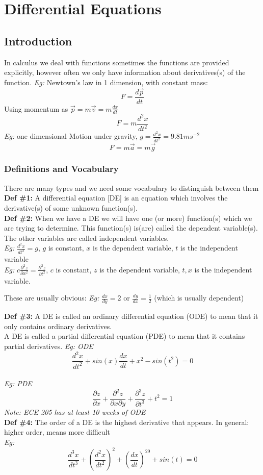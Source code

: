 \documentclass[11pt]{article}
\theoremstyle{definition}
\begin{document}
\section{Differential Equations}
\subsection{Introduction}
In calculus we deal with functions sometimes the functions are provided explicitly, however often we only have information about derivatives(s) of the function. \textit{Eg:} Newtown's law in 1 dimension, with constant mass: $$F = \frac{d\vec{p}}{dt}$$
Using momentum as $\vec{p} = m \vec{v} = m\frac{dx}{dt}$
$$F = m\frac{d^2x}{dt^2}$$
\textit{Eg:} one dimensional Motion under gravity, $g = \frac{d^2x}{dt^2} = 9.81ms^{-2}$
$$F = m\vec{a} = m\vec{g}$$

\subsubsection{Definitions and Vocabulary}
There are many types and we need some vocabulary to distinguish between them\\
\textbf{Def \#1:} A differential equation [DE] is an equation which involves the derivative(s) of some unknown function(s).\\
\textbf{Def \#2:} When we have a DE we will have one (or more) function(s) which we are trying to determine. This function(s) is(are) called the dependent variable(s). The other variables are called independent variables.\\
\textit{Eg:} $\frac{d^2x}{dt^2} = g$, $g$ is constant, $x$ is the dependent variable, $t$ is the independent variable\\
\textit{Eg:} $c\frac{\partial^2z}{\partial x^2} = \frac{\partial^2z}{\partial t^2}$, $c$ is constant, $z$ is the dependent variable, $t, x$ is the independent variable.

These are usually obvious:
\textit{Eg:} $\frac{dx}{dy} = 2$ or $\frac{dy}{dx} = \frac{1}{2}$ (which is usually dependent)

\textbf{Def \#3:} A DE is called an ordinary differential equation (ODE) to mean that it only contains ordinary derivatives.\\
A DE is called a partial differential equation (PDE) to mean that it contains partial derivatives.
\textit{Eg: ODE} $$\frac{d^2x}{dt^2} + sin(x)\frac{dx}{dt} + x^2 - sin(t^2) = 0$$\\
\textit{Eg: PDE} $$\frac{\partial z}{\partial x} + \frac{\partial^2 z}{\partial x \partial y} + \frac{\partial^3 z}{\partial t^3} + t^2 = 1$$
\textit{Note: ECE 205 has at least 10 weeks of ODE}\\
\newpage
\textbf{Def \#4:} The order of a DE is the highest derivative that appears. In general: higher order, means more difficult\\
\textit{Eg:} $$\frac{d^3x}{dt^3} + (\frac{d^2x}{dt^2})^2 + (\frac{dx}{dt})^{29} + sin(t) = 0$$
\end{document}
